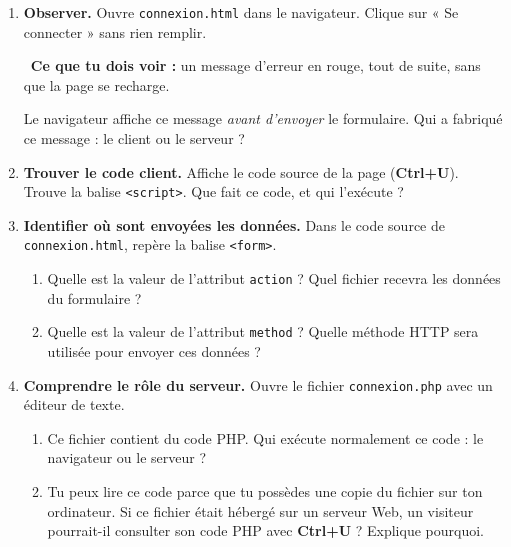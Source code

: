 \documentclass[11pt,a4paper]{article}
\newif\ifprof
\newcommand{\lignes}[1]{\par\foreach \i in {1,...,#1}{\vspace{8.5mm}\hrule height 0.3pt}\vspace{2mm}}
\newcommand{\reponse}[2]{\ifprof\par{\raggedright\textcolor{corr}{#2}\par}\else\lignes{#1}\fi}
\newcommand{\voir}[1]{\par{\small\textcolor{vert}{\ding{51}~\textbf{Ce que tu dois voir :}} #1}\par}
\begin{document}
\begin{enumerate}[leftmargin=*,label=\textbf{Étape \arabic*.},itemsep=4pt]
\item \textbf{Observer.} Ouvre \texttt{connexion.html} dans le navigateur. Clique sur « Se connecter » sans rien remplir.
\voir{un message d'erreur en rouge, tout de suite, sans que la page se recharge.}
Le navigateur affiche ce message \emph{avant d'envoyer} le formulaire. Qui a fabriqué ce message : le client ou le serveur ?
\reponse{2}{Le client : le message apparaît avant tout envoi, la page n'est pas rechargée, aucune requête n'est partie vers un serveur.}
\item \textbf{Trouver le code client.} Affiche le code source de la page (\textbf{Ctrl+U}). Trouve la balise \texttt{<script>}. Que fait ce code, et qui l'exécute ?
\reponse{2}{Il vérifie, avant l'envoi, que les deux champs sont remplis et que l'identifiant contient un \texttt{@}, sinon il affiche un message. Il est exécuté par le navigateur (client), et on peut le lire en entier.}
\item \textbf{Identifier où sont envoyées les données.} Dans le code source de \texttt{connexion.html}, repère la balise \texttt{<form>}.
  \begin{enumerate}[leftmargin=*,label=\alph*)]
  \item Quelle est la valeur de l'attribut \texttt{action} ? Quel fichier recevra les données du formulaire ?
  \item Quelle est la valeur de l'attribut \texttt{method} ? Quelle méthode HTTP sera utilisée pour envoyer ces données ?
  \end{enumerate}
\reponse{2}{a) \texttt{action="connexion.php"} : les données sont destinées à \texttt{connexion.php}. b) \texttt{method="post"} : le navigateur utilise la méthode HTTP POST.}
\item \textbf{Comprendre le rôle du serveur.} Ouvre le fichier \texttt{connexion.php} avec un éditeur de texte.
  \begin{enumerate}[leftmargin=*,label=\alph*)]
  \item Ce fichier contient du code PHP. Qui exécute normalement ce code : le navigateur ou le serveur ?
  \item Tu peux lire ce code parce que tu possèdes une copie du fichier sur ton ordinateur. Si ce fichier était hébergé sur un serveur Web, un visiteur pourrait-il consulter son code PHP avec \textbf{Ctrl+U} ? Explique pourquoi.
  \end{enumerate}
\reponse{3}{a) Le serveur exécute le code PHP. b) Non, dans une configuration normale : le serveur exécute le PHP et renvoie au navigateur le résultat produit (par exemple du HTML), pas le code source PHP. La copie locale est consultable parce qu'elle est accessible à l'élève comme fichier.}
\end{enumerate}
\end{document}
